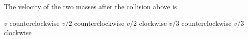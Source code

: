 \documentclass{../../oss-apphys-exam}
\newcounter{last}
\begin{document}
\begin{multicols*}{2}
\begin{questions}
    \question The velocity of the two masses after the collision above is
    \label{moon2}
    \begin{choices}
      \choice $v$ counterclockwise
      \choice $v/2$ counterclockwise
      \choice $v/2$ clockwise
      \choice $v/3$ counterclockwise
      \choice $v/3$ clockwise
    \end{choices}
    \vspace{.7in}
    
%    
  \end{questions}
  \setcounter{last}{\value{question}}
\end{multicols*}
\newpage
\end{document}
